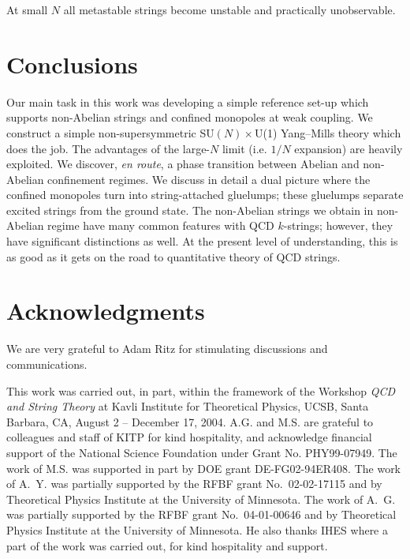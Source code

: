 At small $N$ all metastable strings become 
unstable and  practically unobservable.

\section{Conclusions}

Our main task in this work was developing a simple reference
set-up which supports non-Abelian strings and confined monopoles 
at weak coupling. We construct a simple non-supersymmetric SU$(N)\times$U(1)
Yang--Mills theory which does the job. The advantages of the large-$N$
limit (i.e. $1/N$ expansion) are heavily exploited.
We discover, {\em en route},
a phase transition between Abelian and non-Abelian confinement regimes.
We discuss in detail a dual picture where the confined monopoles
turn into string-attached gluelumps; these gluelumps separate
excited strings from the ground state. The non-Abelian strings we
obtain in non-Abelian regime have many common features with QCD $k$-strings;
however, they have significant distinctions as well. At the present level 
of understanding, this is as good as it gets on the road to
quantitative theory of QCD strings.

\section*{Acknowledgments}

We are very grateful to Adam Ritz for stimulating discussions and communications.

This work was carried out, in part, within the framework of
the Workshop {\sl QCD and String Theory} at  
Kavli Institute for Theoretical Physics,
UCSB, Santa Barbara, CA, August 2 -- December 17, 2004.
A.G. and M.S. are grateful to colleagues and staff of KITP 
for kind hospitality, and acknowledge financial support of the National 
Science Foundation under Grant No. PHY99-07949.
The work  of M.S. was supported in part by DOE grant DE-FG02-94ER408.
The work of A.~Y. was partially supported by the RFBF grant No.~02-02-17115
and by Theoretical Physics Institute at the University of Minnesota.
The work of A.~G. was partially supported by the RFBF grant No.~04-01-00646
and by Theoretical Physics Institute
at the University of Minnesota. He also thanks IHES where
a part of the work was carried out, for  kind hospitality and support.

\newpage

